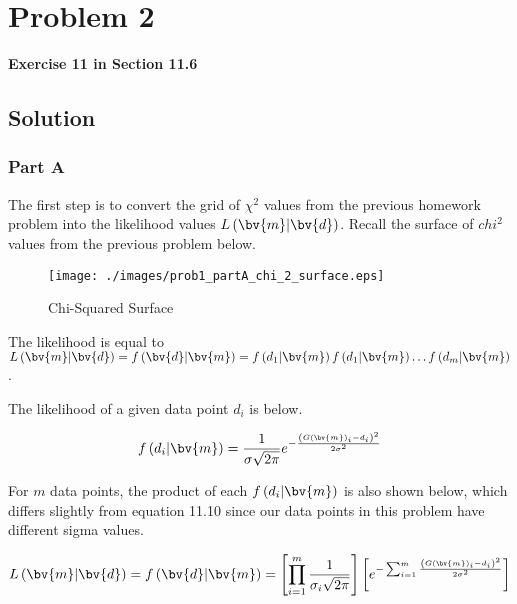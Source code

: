 
\begingroup
\allowdisplaybreaks

\newpage
\section{Problem 2}

\textbf{Exercise 11 in Section 11.6}

\subsection{Solution}

\subsubsection{Part A}

The first step is to convert the grid of $\chi^2$ values from the previous homework problem into the likelihood values $L\left(\bv{m}|\bv{d}\right)$. Recall the surface of $chi^2$ values from the previous problem below. 

\begin{figure}[h] 
	\centering
	\texttt{[image: ./images/prob1\_partA\_chi\_2\_surface.eps]}
	\caption{Chi-Squared Surface}
	\label{fig: prob1 chi2 surface}
\end{figure}
\FloatBarrier

The likelihood is equal to $L\left(\bv{m}|\bv{d}\right) = f\left(\bv{d}|\bv{m}\right) = f\left(d_1|\bv{m}\right) f\left(d_1|\bv{m}\right) \ldots f\left(d_m|\bv{m}\right)$.

The likelihood of a given data point $d_i$ is below. 

\begin{align*}
	f\left(d_i|\bv{m}\right) = \frac{1}{\sigma\sqrt{2\pi}} e^{-\frac{\left(G(\bv{m})_i - d_i\right)^2}{2\sigma^2}}
\end{align*}

For $m$ data points, the product of each $f\left(d_i|\bv{m}\right)$ is also shown below, which differs slightly from equation 11.10 since our data points in this problem have different sigma values.

\begin{align*}
	L\left(\bv{m}|\bv{d}\right) = f\left(\bv{d}|\bv{m}\right) = \left[\prod_{i=1}^{m}\frac{1}{\sigma_i\sqrt{2\pi}}\right] \left[e^{-\sum_{i=1}^{m} \frac{\left(G(\bv{m})_i - d_i\right)^2}{2\sigma^2}}\right]
\end{align*} 

